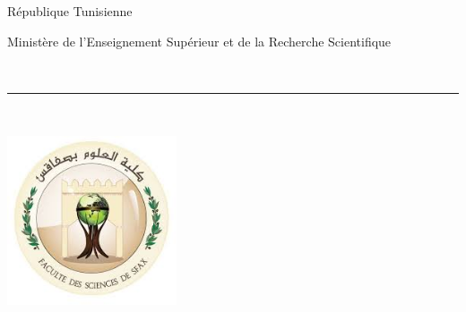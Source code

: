 


\begin{titlepage}
    \centering
    {\small République Tunisienne    \begin{Arabic}
    
	\end{Arabic}
    {\small Ministère de l'Enseignement Supérieur et de la Recherche Scientifique}\\
        \begin{Arabic}
        \\
	\end{Arabic}
\rule{\linewidth}{0.3mm} \\[0.4cm]

\begin{minipage}{5cm}
	\begin{center}
		\includegraphics[width=5cm]{images_pfe/fss.jpeg}
	\end{center}
\end{minipage}\hfill
\begin{minipage}{10cm}
	\begin{flushright}
	\begin{Arabic}
	

\end{Arabic}
\end{flushright}
\end{minipage}}
\end{titlepage}
